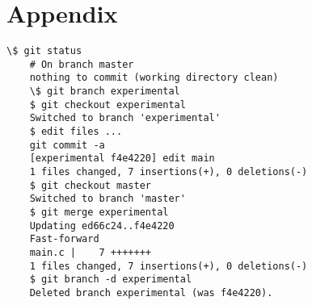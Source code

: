 \documentclass[oneside,bachelor,etd]{BYUPhys}
\begin{document}
\chapter{Appendix}
\label{sec:appendix}

\begin{lstlisting}[label=Git revision control,caption=Git revision control]	
	\$ git status
	# On branch master
	nothing to commit (working directory clean)
	\$ git branch experimental
	$ git checkout experimental 
	Switched to branch 'experimental'
	$ edit files ...
	git commit -a
	[experimental f4e4220] edit main
 	1 files changed, 7 insertions(+), 0 deletions(-)
	$ git checkout master
	Switched to branch 'master'
	$ git merge experimental
	Updating ed66c24..f4e4220
	Fast-forward
	main.c |    7 +++++++
 	1 files changed, 7 insertions(+), 0 deletions(-)
	$ git branch -d experimental 
	Deleted branch experimental (was f4e4220).
\end{lstlisting}


 \cleardoublepage
 \singlespace
 \printindex
\end{document}
